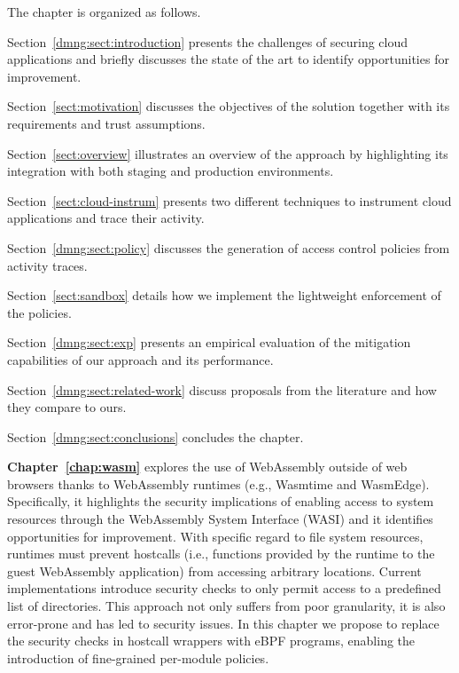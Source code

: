 \smallskip
\noindent The chapter is organized as follows.
\begin{compactitem}
    \item Section~\ref{dmng:sect:introduction} presents the challenges
     of securing cloud applications and briefly discusses the state of
     the art to identify opportunities for improvement.
    \item Section~\ref{sect:motivation} discusses the objectives of
     the solution together with its requirements and trust
     assumptions.
    \item Section~\ref{sect:overview} illustrates an overview of the
     approach by highlighting its integration with both staging and
     production environments.
    \item Section~\ref{sect:cloud-instrum} presents two different
     techniques to instrument cloud applications and trace their
     activity.
    \item Section~\ref{dmng:sect:policy} discusses the generation of
     access control policies from activity traces.
    \item Section~\ref{sect:sandbox} details how we implement the
     lightweight enforcement of the policies.
    \item Section~\ref{dmng:sect:exp} presents an empirical
     evaluation of the mitigation capabilities of our approach and
     its performance.
    \item Section~\ref{dmng:sect:related-work} discuss proposals from
     the literature and how they compare to ours.
    \item Section~\ref{dmng:sect:conclusions} concludes the chapter.
\end{compactitem}
\medskip

\textbf{Chapter~\ref{chap:wasm}} explores the use of WebAssembly
outside of web browsers thanks to WebAssembly runtimes (e.g., Wasmtime
and WasmEdge). Specifically, it highlights the security implications
of enabling access to system resources through the WebAssembly System
Interface (WASI) and it identifies opportunities for improvement. With
specific regard to file system resources, runtimes must prevent
hostcalls (i.e., functions provided by the runtime to the guest
WebAssembly application) from accessing arbitrary locations. Current
implementations introduce security checks to only permit access to a
predefined list of directories. This approach not only suffers from
poor granularity, it is also error-prone and has led to security
issues. In this chapter we propose to replace the security checks in
hostcall wrappers with eBPF programs, enabling the introduction of
fine-grained per-module policies.

